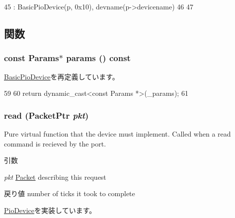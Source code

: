 \begin{DoxyCode}
45     : BasicPioDevice(p, 0x10), devname(p->devicename)
46 {
47 }
\end{DoxyCode}


\subsection{関数}
\hypertarget{classBadDevice_acd3c3feb78ae7a8f88fe0f110a718dff}{
\subsubsection[{params}]{\setlength{\rightskip}{0pt plus 5cm}const {\bf Params}$\ast$ params () const}}
\label{classBadDevice_acd3c3feb78ae7a8f88fe0f110a718dff}


\hyperlink{classBasicPioDevice_acd3c3feb78ae7a8f88fe0f110a718dff}{BasicPioDevice}を再定義しています。


\begin{DoxyCode}
59     {
60         return dynamic_cast<const Params *>(_params);
61     }
\end{DoxyCode}
\hypertarget{classBadDevice_a613ec7d5e1ec64f8d21fec78ae8e568e}{
\subsubsection[{read}]{ read ({\bf PacketPtr} {\em pkt})}}
\label{classBadDevice_a613ec7d5e1ec64f8d21fec78ae8e568e}
Pure virtual function that the device must implement. Called when a read command is recieved by the port. 
\begin{DoxyParams}{引数}
\item[{\em pkt}]\hyperlink{classPacket}{Packet} describing this request \end{DoxyParams}
\begin{DoxyReturn}{戻り値}
number of ticks it took to complete 
\end{DoxyReturn}


\hyperlink{classPioDevice_a842312590432036092c422c87a442358}{PioDevice}を実装しています。


